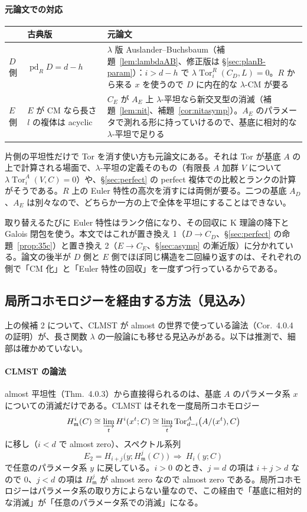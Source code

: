 \documentclass[11pt,a4paper]{ltjsarticle}
\numberwithin{equation}{section}
\theoremstyle{plain}
\theoremstyle{definition}
\theoremstyle{definition}
\newcommand{\m}{\mathfrak{m}}
\newcommand{\Tor}{\operatorname{Tor}}
\begin{document}
\paragraph{元論文での対応}
\begin{center}
\small
\begin{tabularx}{\textwidth}{>{\raggedright}p{1.4cm}>{\raggedright}X>{\raggedright\arraybackslash}X}
\toprule
 & 古典版 & 元論文 \\
\midrule
$D$ 側 & $\operatorname{pd}_R D = d-h$ & $\lambda$ 版 Auslander--Buchsbaum（補題~\ref{lem:lambdaAB}、修正版は \S\ref{sec:planB-param}）：$i>d-h$ で $\lambda\Tor^R_i(C_D,L) = 0$。$R$ から来る $x$ を使うので $D$ に内在的な $\lambda$-CM が要る \\
$E$ 側 & $E$ が CM なら長さ $l$ の複体は acyclic & $C_E$ が $A_E$ 上 $\lambda$-平坦なら新交叉型の消滅（補題~\ref{lem:nit}、補題~\ref{cor:nitasymp}）。$A_E$ のパラメータで測れる形に持っていけるので、基底に相対的な $\lambda$-平坦で足りる \\
\bottomrule
\end{tabularx}
\end{center}
片側の平坦性だけで Tor を消す使い方も元論文にある。それは Tor が基底 $A$ の上で計算される場面で、$\lambda$-平坦の定義そのもの（有限長 $A$ 加群 $V$ について $\lambda\Tor^A_i(V,C) = 0$）や、§\ref{sec:perfect} の perfect 複体での比較とランクの計算がそうである。$R$ 上の Euler 特性の高次を消すには両側が要る。二つの基底 $A_D$、$A_E$ は別々なので、どちらか一方の上で全体を平坦にすることはできない。

取り替えるたびに Euler 特性はランク倍になり、その回収に K 理論の降下と Galois 閉包を使う。本文ではこれが置き換え 1（$D\to C_D$、§\ref{sec:perfect} の命題~\ref{prop:35c}）と置き換え 2（$E\to C_E$、§\ref{sec:asymp} の漸近版）に分かれている。論文の後半が $D$ 側と $E$ 側でほぼ同じ構造を二回繰り返すのは、それぞれの側で「CM 化」と「Euler 特性の回収」を一度ずつ行っているからである。

\subsection{局所コホモロジーを経由する方法（見込み）}\label{sec:lflat-lc}

上の候補 2 について、CLMST が almost の世界で使っている論法（Cor.~4.0.4 の証明）が、長さ関数 $\lambda$ の一般論にも移せる見込みがある。以下は推測で、細部は確かめていない。

\paragraph{CLMST の論法}
almost 平坦性（Thm.~4.0.3）から直接得られるのは、基底 $A$ のパラメータ系 $x$ についての消滅だけである。CLMST はそれを一度局所コホモロジー
\[
  H^i_\m(C) \cong \varinjlim_t H^i(x^t;C) \cong \varinjlim_t \Tor^A_{d-i}\bigl(A/(x^t),C\bigr)
\]
に移し（$i<d$ で almost zero）、スペクトル系列
\[
  E_2 = H_{i+j}\bigl(y;H^j_\m(C)\bigr)\ \Longrightarrow\ H_i(y;C)
\]
で任意のパラメータ系 $y$ に戻している。$i>0$ のとき、$j = d$ の項は $i+j>d$ なので $0$、$j<d$ の項は $H^j_\m$ が almost zero なので almost zero である。局所コホモロジーはパラメータ系の取り方によらない量なので、この経由で「基底に相対的な消滅」が「任意のパラメータ系での消滅」になる。
\end{document}
